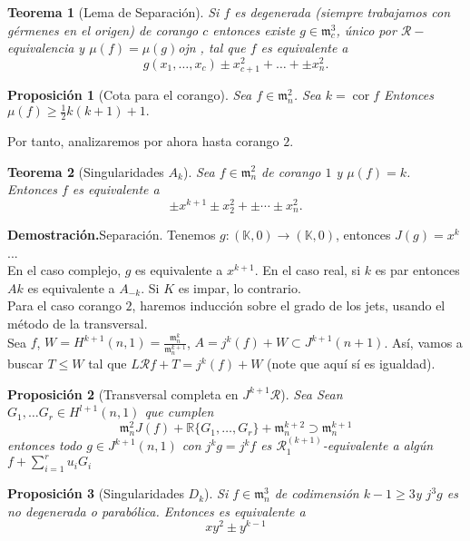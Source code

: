 \documentclass[12pt]{book}
\newtheorem{teo}{Teorema}
\newtheorem{pro}{Proposición}
\newcommand{\rg}{\mathcal{R}}
\newcommand{\mm}{\mathfrak{m}_n}
\newcommand{\dem}{\textbf{Demostración.}}
\begin{document}
\begin{teo}[Lema de Separación]
Si $f$ es degenerada (siempre trabajamos con gérmenes en el origen) de corango $c$ entonces existe $g\in \mathfrak{m}_c ^3$, único por $\mathcal{R}-$equivalencia y $\mu(f)= \mu (g)$ojn     , tal que $f$ es equivalente a $$g(x_1, \ldots, x_c) \pm x_{c+1 }^2 + \ldots + \pm x^2_n.$$
\end{teo}


\begin{pro}[Cota para el corango]
	Sea $f\in \mm ^2$. Sea $k= \operatorname{cor} f$ Entonces $ \mu (f) \geq \frac{1}{2} k (k+1) +1.$
\end{pro}

Por tanto, analizaremos por ahora hasta corango $2$.\\




\begin{teo}[Singularidades $A_k$]
Sea $f\in \mm^2$ de corango $1$ y $\mu (f)=k$. Entonces $f$ es equivalente a $$  \pm x^{k+1}  \pm x_2^2 + \pm \cdots \pm x_n^2 .$$
\end{teo}
\dem Separación. Tenemos $g: (\mathbb{K},0) \rightarrow(\mathbb{K},0)$, entonces $J(g)= x^k$... \\
En el caso complejo, $g$ es equivalente a $x^{k+1}$. En el caso real, si $k$ es par entonces $Ak$ es equivalente a $A_{-k}$. Si $K$ es impar, lo contrario.\\

Para el caso corango $2$, haremos inducción sobre el grado de los jets, usando el método de la transversal.\\ %
Sea $f$, $W = H^{k+1} (n,1) = \frac{\mm^k}{\mm^{k+1}}$, $A = j^k (f) + W \subset J^{k+1}(n+1)$. Así, vamos a buscar $T\leqslant W$ tal que $L \rg f + T = j^k (f) + W$ (note que aquí sí es igualdad). 

\begin{pro}[Transversal completa en $J^{k+1}\rg$]
Sea Sean $G_1, \ldots G_r \in H^{l+1}(n,1)$ que cumplen $$  \mm ^2 J(f) + \mathbb{R} \{G_1 , \ldots , G_r\}  + \mm ^{k+2} \supset \mm ^{k+1} $$ entonces todo $g \in J^{k+1}(n,1)$ con $j^k g = j^k f$ es $\rg_1^{(k+1)}$-equivalente a algún $ f+ \sum _{i=1}^r  u_i G_i $
\end{pro}




\begin{pro}[Singularidades $D_k$]
Si $f\in \mm^3$ de codimensión $k -1 \geq 3$y $j^3 g$ es no degenerada o parabólica. Entonces es equivalente a $$xy^2 \pm y^{k-1} $$
\end{pro}
\end{document}
